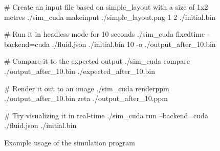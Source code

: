 \begin{figure}[ht]
    \centering
    \begin{bashcode}
# Create an input file based on simple_layout with a size of 1x2 metres
./sim_cuda makeinput ./simple_layout.png 1 2 ./initial.bin

# Run it in headless mode for 10 seconds
./sim_cuda fixedtime --backend=cuda ./fluid.json ./initial.bin 10  -o ./output_after_10.bin

# Compare it to the expected output
./sim_cuda compare ./output_after_10.bin ./expected_after_10.bin

# Render it out to an image
./sim_cuda renderppm ./output_after_10.bin zeta ./output_after_10.ppm

# Try visualizing it in real-time
./sim_cuda run --backend=cuda ./fluid.json ./initial.bin
\end{bashcode}
    \caption{Example usage of the simulation program}
    \label{fig:BashExampleUsage}
\end{figure}